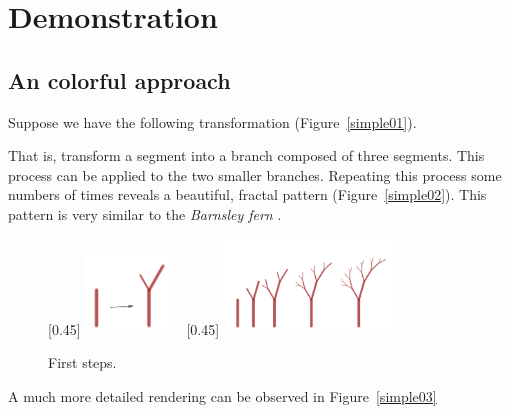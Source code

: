 \section{Demonstration}

    \subsection{An colorful approach}

        Suppose we have the following transformation (Figure~\ref{simple01}).
        

        That is, transform a segment into a branch composed of three segments.
        This process can be applied to the two smaller branches.
        Repeating this process some numbers of times reveals a beautiful, fractal pattern (Figure~\ref{simple02}).
        This pattern is very similar to the \emph{Barnsley fern} \cite{barnsley_fern}.

        \begin{figure}[ht]
            \centering
            \caption{First steps.}
            [0.45\textwidth]
                {\includegraphics[width=0.2\textwidth]{img/simple01.png}}
            ~
            [0.45\textwidth]
                {\includegraphics[width=0.4\textwidth]{img/simple02.png}}            
        \end{figure}
        \FloatBarrier

        A much more detailed rendering can be observed in Figure~\ref{simple03}

